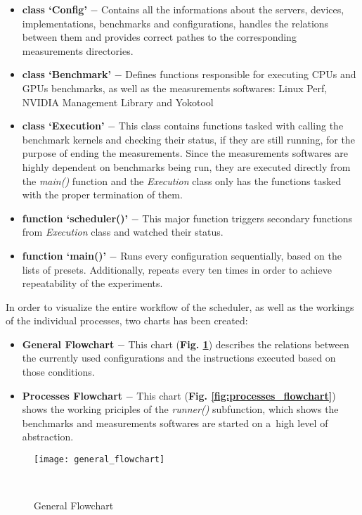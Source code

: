 \begin{itemize}
    \item \textbf{class `Config'} $-$ Contains all the informations about the servers,
    devices, implementations, benchmarks and configurations, handles the
    relations between them and provides correct pathes to the corresponding
    measurements directories.
    \item \textbf{class `Benchmark'} $-$ Defines functions responsible for
    executing CPUs and GPUs benchmarks, as well as the measurements
    softwares: Linux Perf, NVIDIA Management Library and Yokotool
    \item \textbf{class `Execution'} $-$ This class contains functions tasked with
    calling the benchmark kernels and checking their status, if they are still
    running, for the purpose of ending the measurements. Since the
    measurements softwares are highly dependent on benchmarks being run, they
    are executed directly from the \emph{main\@()} function and
    the \emph{Execution} class only has the functions tasked with the proper
    termination of them.
    \item \textbf{function `scheduler\@()'} $-$ This major function triggers
    secondary functions from \emph{Execution} class and watched their status.
    \item \textbf{function `main\@()'} $-$ Runs every configuration
    sequentially, based on the lists of presets. Additionally, repeats every
    ten times in order to achieve repeatability of the experiments.
\end{itemize}

In order to visualize the entire workflow of the scheduler, as well as the 
workings of the individual processes, two charts has been created:
\begin{itemize}
    \item \textbf{General Flowchart} $-$ This chart
    (\textbf{Fig. \ref{fig:general_flowchart}}) describes the relations
    between the currently used configurations and the instructions executed
    based on those conditions.
    \item \textbf{Processes Flowchart} $-$ This chart
    (\textbf{Fig. \ref{fig:processes_flowchart}}) shows the working priciples of the
    \emph{runner\@()} subfunction, which shows the benchmarks and measurements
    softwares are started on a~high level of abstraction.
\end{itemize}

\newpage

\begin{figure}[hbtp!]
    \centering
    \texttt{[image: general\_flowchart]}
    \caption{General Flowchart}~\label{fig:general_flowchart}
\end{figure}

